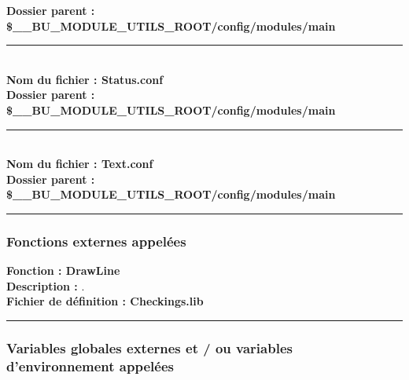 \documentclass[a4paper,10pt]{article}
\begin{document}
\textbf{Dossier parent : \color{orange}\$\_\_BU\_MODULE\_UTILS\_ROOT\color{lime}/config/modules/main}\\[1\baselineskip]



\color{lime}\par\noindent\rule{\textwidth}{0.4pt}\color{white}\\[1\baselineskip]

\textbf{Nom du fichier : \color{lime}Status.conf}\\[1\baselineskip]

\textbf{Dossier parent : \color{orange}\$\_\_BU\_MODULE\_UTILS\_ROOT\color{lime}/config/modules/main}\\[1\baselineskip]



\color{lime}\par\noindent\rule{\textwidth}{0.4pt}\color{white}\\[1\baselineskip]

\textbf{Nom du fichier : \color{lime}Text.conf}\\[1\baselineskip]

\textbf{Dossier parent : \color{orange}\$\_\_BU\_MODULE\_UTILS\_ROOT\color{lime}/config/modules/main}\\[1\baselineskip]



\color{blue}\par\noindent\rule{\textwidth}{0.4pt}\color{white}

\color{blue}
\subsubsection{Fonctions externes appelées}\color{white}

\textbf{Fonction : \color{mauve}DrawLine}\\[1\baselineskip]

\textbf{Description :} .\\[1\baselineskip]

\textbf{Fichier de définition : \color{lime}Checkings.lib}\\[1\baselineskip]



\color{blue}\par\noindent\rule{\textwidth}{0.4pt}\color{white}

\color{blue}
\subsubsection{Variables globales externes et / ou variables d'environnement appelées}\color{white}
\end{document}
